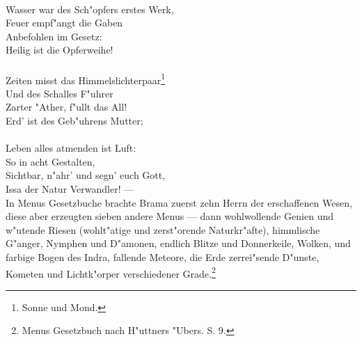 \documentclass[a4paper, 11pt, oneside, polutonikogreek, german]{article}
\begin{document}
\\
Wasser war des Sch"opfers erstes Werk,\\
Feuer empf"angt die Gaben\\
Anbefohlen im Gesetz:\\
Heilig ist die Opferweihe!\\
\\
\hspace*{1cm} Zeiten misst das Himmelslichterpaar\footnote{Sonne und Mond.}\\
\hspace*{1cm} Und des Schalles F"uhrer\\
\hspace*{1cm} Zarter "Ather, f"ullt das All!\\
\hspace*{1cm} Erd' ist des Geb"uhrens Mutter;\\
\\
\hspace*{2cm} Leben alles atmenden ist Luft:\\
\hspace*{2cm} So in acht Gestalten,\\
\hspace*{2cm} Sichtbar, n"ahr' und segn' euch Gott,\\
\hspace*{2cm} Issa der Natur Verwandler! ---\\

In Menus Gesetzbuche brachte Brama zuerst zehn Herrn der erschaffenen Wesen, diese aber erzeugten sieben andere Menus --- dann wohlwollende Genien und w"utende Riesen (wohlt"atige und zerst"orende Naturkr"afte), himmlische G"anger, Nymphen und D"amonen, endlich Blitze und Donnerkeile, Wolken, und farbige Bogen des Indra, fallende Meteore, die Erde zerrei"sende D"unste, Kometen und Lichtk"orper verschiedener Grade.\footnote{Menus Gesetzbuch nach H"uttners "Ubers. S. 9.}
\end{document}
